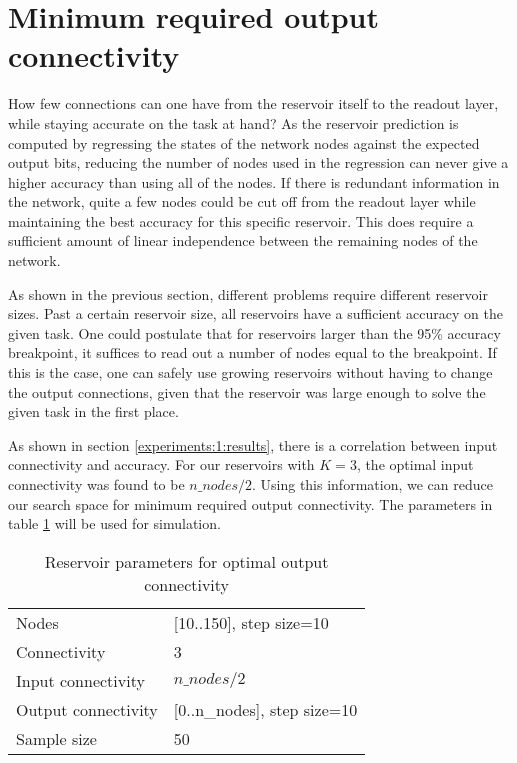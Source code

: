 \section{Minimum required output connectivity}

How few connections can one have from the reservoir itself to the readout layer,
while staying accurate on the task at hand?
As the reservoir prediction is computed by regressing the states of the network nodes against the expected output bits,
reducing the number of nodes used in the regression can never give a higher accuracy than using all of the nodes.
If there is redundant information in the network, quite a few nodes could be cut off from the readout layer while maintaining the best accuracy for this specific reservoir.
This does require a sufficient amount of linear independence between the remaining nodes of the network.

As shown in the previous section, different problems require different reservoir sizes.
Past a certain reservoir size, all reservoirs have a sufficient accuracy on the given task.
One could postulate that for reservoirs larger than the 95\% accuracy breakpoint,
it suffices to read out a number of nodes equal to the breakpoint.
If this is the case, one can safely use growing reservoirs without having to change the output connections,
given that the reservoir was large enough to solve the given task in the first place.

As shown in section \ref{experiments:1:results}, there is a correlation between input connectivity and accuracy.
For our reservoirs with $K=3$, the optimal input connectivity was found to be $n\_nodes/2$.
Using this information, we can reduce our search space for minimum required output connectivity.
The parameters in table \ref{tab:oc-reservoir-parameters} will be used for simulation.

\begin{table}[ht]
    \centering
    \caption{Reservoir parameters for optimal output connectivity}
    \label{tab:oc-reservoir-parameters}
    \begin{tabular}{ll}
        Nodes               & [10..150], step size=10           \\
        Connectivity        & 3                                 \\
        Input connectivity  & $ n\_nodes / 2 $                  \\
        Output connectivity & [0..n\_nodes], step size=10       \\
        Sample size         & 50
    \end{tabular}
\end{table}

